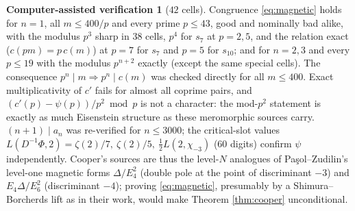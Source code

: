 \documentclass[11pt]{amsart}
\theoremstyle{definition}
\newtheorem{verification}[theorem]{Computer-assisted verification}
\theoremstyle{remark}
\begin{document}
\begin{verification}[$42$ cells]\label{ver:cooper}
Congruence \eqref{eq:magnetic} holds for $n=1$, all $m\le400/p$ and every prime $p\le43$, good and nominally bad alike, with the modulus $p^3$ sharp in $38$ cells, $p^4$ for $s_7$ at $p=2,5$, and the relation exact ($c(pm)=p\,c(m)$) at $p=7$ for $s_7$ and $p=5$ for $s_{10}$; and for $n=2,3$ and every $p\le19$ with the modulus $p^{n+2}$ exactly (except the same special cells). The consequence $p^n\mid m\Rightarrow p^n\mid c(m)$ was checked directly for all $m\le400$. Exact multiplicativity of $c'$ fails for almost all coprime pairs, and $(c'(p)-\psi(p))/p^2\bmod p$ is not a character: the mod-$p^2$ statement is exactly as much Eisenstein structure as these meromorphic sources carry. $(n+1)\mid a_n$ was re-verified for $n\le3000$; the critical-slot values $L(D^{-1}\Phi,2)=\zeta(2)/7,\ \zeta(2)/5,\ \tfrac12L(2,\chi_{-3})$ (60 digits) confirm $\psi$ independently. Cooper's sources are thus the level-$N$ analogues of Pa\c sol--Zudilin's level-one magnetic forms $\Delta/E_4^2$ (double pole at the point of discriminant $-3$) and $E_4\Delta/E_6^2$ (discriminant $-4$); proving \eqref{eq:magnetic}, presumably by a Shimura--Borcherds lift as in their work, would make Theorem \ref{thm:cooper} unconditional.


\end{verification}
\end{document}
